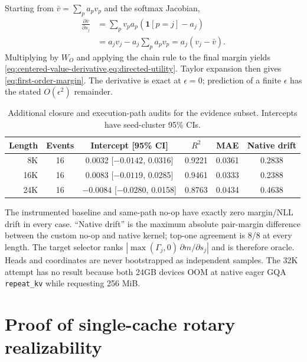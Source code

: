 Starting from $\bar v=\sum_p a_pv_p$ and the softmax Jacobian,
\begin{align}
  \frac{\partial\bar v}{\partial s_j}
  &=\sum_p v_p a_p(\mathbf 1[p=j]-a_j)\\
  &=a_jv_j-a_j\sum_p a_pv_p
  =a_j(v_j-\bar v).
  \label{eq:appendix-centered-value}
\end{align}
Multiplying by $W_O$ and applying the chain rule to the final margin yields
\cref{eq:centered-value-derivative,eq:directed-utility}.  Taylor expansion then
gives \cref{eq:first-order-margin}.  The derivative is exact at
$\epsilon=0$; prediction of a finite $\epsilon$ has the stated
$O(\epsilon^2)$ remainder.

\begin{table}[h]
  \centering
  \small
  \caption{Additional closure and execution-path audits for the evidence
  subset.  Intercepts have seed-cluster 95\% CIs.}
  \label{tab:closure-audit}
  \begin{tabular}{@{}rccccc@{}}
    \toprule
    Length & Events & Intercept [95\% CI] & $R^2$ & MAE & Native drift \\
    \midrule
    8K  & 16 & 0.0032 [$-0.0142$, 0.0316] & 0.9221 & 0.0361 & 0.2838 \\
    16K & 16 & 0.0083 [$-0.0119$, 0.0285] & 0.9461 & 0.0333 & 0.2388 \\
    24K & 16 & $-0.0084$ [$-0.0280$, 0.0158] & 0.8763 & 0.0434 & 0.4638 \\
    \bottomrule
  \end{tabular}
\end{table}

The instrumented baseline and same-path no-op have exactly zero margin/NLL
drift in every case.  ``Native drift'' is the maximum absolute pair-margin
difference between the custom no-op and native kernel; top-one agreement is
8/8 at every length.  The target selector ranks
$|\max(\Gamma_j,0)\,\partial m/\partial s_j|$ and is therefore oracle.  Heads
and coordinates are never bootstrapped as
independent samples.  The 32K attempt has no result because both 24GB devices
OOM at native eager GQA \texttt{repeat\_kv} while requesting 256 MiB.

\section{Proof of single-cache rotary realizability}
\label{app:realizability}


